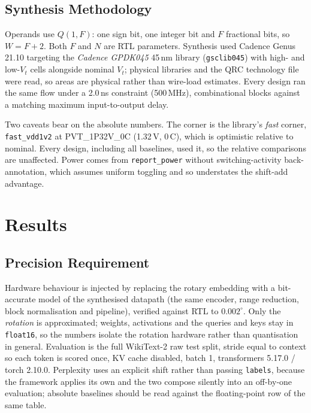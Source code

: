 \documentclass[conference]{IEEEtran}
\begin{document}
\subsection{Synthesis Methodology}
\label{sec:method}

Operands use $Q(1,F)$: one sign bit, one integer bit and $F$ fractional bits,
so $W = F+2$. Both $F$ and $N$ are RTL parameters. Synthesis used Cadence Genus
21.10 targeting the \emph{Cadence GPDK045} 45\,nm library (\texttt{gsclib045})
with high- and low-$V_t$ cells alongside nominal $V_t$; physical libraries and
the QRC technology file were read, so areas are physical rather than wire-load
estimates. Every design ran the same flow under a 2.0\,ns constraint
(500\,MHz), combinational blocks against a matching maximum input-to-output
delay.

Two caveats bear on the absolute numbers. The corner is the library's
\emph{fast} corner, \texttt{fast\_vdd1v2} at PVT\_1P32V\_0C (1.32\,V,
0\,\textdegree C), which is optimistic relative to nominal. Every design,
including all baselines, used it, so the relative comparisons are unaffected.
Power comes from \texttt{report\_power} without switching-activity
back-annotation, which assumes uniform toggling and so understates the
shift-add advantage.

\section{Results}
\label{sec:results}

\subsection{Precision Requirement}
\label{sec:precision}

Hardware behaviour is injected by replacing the rotary embedding with a
bit-accurate model of the synthesised datapath (the same encoder, range
reduction, block normalisation and pipeline), verified against RTL to
$0.002^{\circ}$. Only the \emph{rotation} is approximated; weights, activations
and the queries and keys stay in \texttt{float16}, so the numbers isolate the
rotation hardware rather than quantisation in general. Evaluation is the full
WikiText-2 raw test split, stride equal to context so each token is scored
once, KV cache disabled, batch 1, transformers 5.17.0 / torch 2.10.0.
Perplexity uses an explicit shift rather than passing \texttt{labels}, because
the framework applies its own and the two compose silently into an off-by-one
evaluation; absolute baselines should be read against the floating-point row of
the same table.
\end{document}
